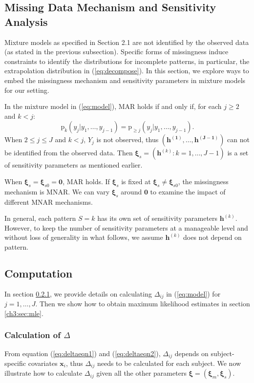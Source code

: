 \documentclass[12pt]{article}
\newcommand{\pr}{\mbox{p}}
\begin{document}
\subsection{Missing Data Mechanism and Sensitivity Analysis}
\label{ch3:sec:sa}

Mixture models as specified in Section 2.1 are not identified
by the observed data (as stated in the previous subsection). Specific forms of missingness
induce constraints to identify the distributions for
incomplete patterns, in particular, the extrapolation distribution in
(\ref{eq:decompose}). In this section, we explore ways to embed the
missingness mechanism and sensitivity parameters in mixture models for
our setting.

In the mixture model in (\ref{eq:model}), MAR holds \citep{molen1998,
  wang2011} if and only if, for each $j \geq 2$ and $k < j$:
\begin{displaymath}
  \pr_k(y_j|y_1, \ldots, y_{j-1}) = \pr_{\geq j}(y_j|y_1, \ldots, y_{j-1}).
\end{displaymath}
When $2 \leq j \leq J$ and $k < j$, $Y_j$ is not observed, thus
$(\bm{h^{(1)},\ldots,h^{(J-1)}})$ can not be identified from the
observed data.
Then $\bm \xi_s = (\bm h^{(k)}: k=1,\ldots,J-1)$ is a set
of sensitivity parameters \citep{dh2008} as mentioned earlier.

When $\bm \xi_s = \bm \xi_{s0} = \bm 0$, MAR holds. If
$\bm \xi_s$ is fixed at $\bm \xi_s \neq \bm \xi_{s0}$, the
missingness mechanism is MNAR. We can vary $\bm \xi_s$ around
$\bm 0$ to examine the impact of different MNAR mechanisms.

In general, each pattern $S = k$ has its own set of sensitivity
parameters $\bm h^{(k)}$. However, to keep the number of
sensitivity parameters at a manageable level \citep{dh2008} and
without loss of generality in what follows, we assume $\bm h^{(k)}$ does not depend
on pattern.

\subsection{Computation}
\label{ch3:sec:computation}

In section \ref{ch3:sec:deltacal}, we provide details on calculating
$\Delta_{ij}$ in (\ref{eq:model}) for $j = 1, \ldots, J$. Then we show
how to obtain maximum likelihood estimates in section
\ref{ch3:sec:mle}.

\subsubsection{Calculation of $\Delta$ }
\label{ch3:sec:deltacal}
From equation (\ref{eq:deltaeqn1}) and (\ref{eq:deltaeqn2}),
$\Delta_{ij}$ depends on subject-specific covariates $\bm x_{i}$,
thus $\Delta_{ij}$ needs to be calculated for each subject. We now
illustrate how to calculate $\Delta_{ij}$ given all the other
parameters $\bm \xi = (\bm \xi_m, \bm \xi_s)$.
\end{document}
